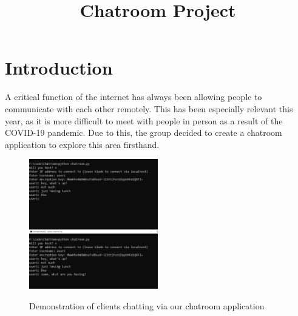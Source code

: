 \documentclass{article}
\begin{document}
\sloppy



\title{Chatroom Project}
%
\address{}


\maketitle


%



%
%
\section{Introduction}
\label{sec:intro}
A critical function of the internet has always been allowing people to communicate with each other remotely. This has been especially relevant this year, as it is more difficult to meet with people in person as a result of the COVID-19 pandemic. Due to this, the group decided to create a chatroom application to explore this area firsthand. 

\begin{figure}[h]
\caption{Demonstration of clients chatting via our chatroom application}
\centering
\includegraphics[width=0.5\textwidth]{media/usersChatting.PNG}
\label{usersChatting}
\end{figure}
\end{document}
